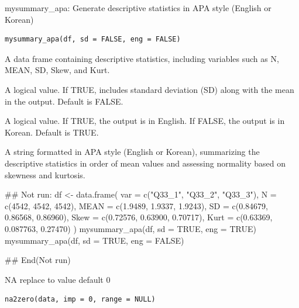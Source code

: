 \documentclass[a4paper]{book}
\begin{document}
%
\begin{Description}
mysummary\_apa: Generate descriptive statistics in APA style (English or Korean)
\end{Description}
%
\begin{Usage}
\begin{verbatim}
mysummary_apa(df, sd = FALSE, eng = FALSE)
\end{verbatim}
\end{Usage}
%
\begin{Arguments}
\begin{ldescription}
\item[\code{df}] A data frame containing descriptive statistics, including variables such as N, MEAN, SD, Skew, and Kurt.

\item[\code{sd}] A logical value. If TRUE, includes standard deviation (SD) along with the mean in the output. Default is FALSE.

\item[\code{eng}] A logical value. If TRUE, the output is in English. If FALSE, the output is in Korean. Default is TRUE.
\end{ldescription}
\end{Arguments}
%
\begin{Value}
A string formatted in APA style (English or Korean), summarizing the descriptive statistics in order of mean values and assessing normality based on skewness and kurtosis.
\end{Value}
%
\begin{Examples}
\begin{ExampleCode}
\#\# Not run: 
df <- data.frame(
  var = c("Q33_1", "Q33_2", "Q33_3"),
  N = c(4542, 4542, 4542),
  MEAN = c(1.9489, 1.9337, 1.9243),
  SD = c(0.84679, 0.86568, 0.86960),
  Skew = c(0.72576, 0.63900, 0.70717),
  Kurt = c(0.63369, 0.087763, 0.27470)
)
mysummary_apa(df, sd = TRUE, eng = TRUE)
mysummary_apa(df, sd = TRUE, eng = FALSE)

## End(Not run)
\end{ExampleCode}
\end{Examples}
%
\begin{Description}
NA replace to value default 0
\end{Description}
%
\begin{Usage}
\begin{verbatim}
na2zero(data, imp = 0, range = NULL)
\end{verbatim}
\end{Usage}
\end{document}
